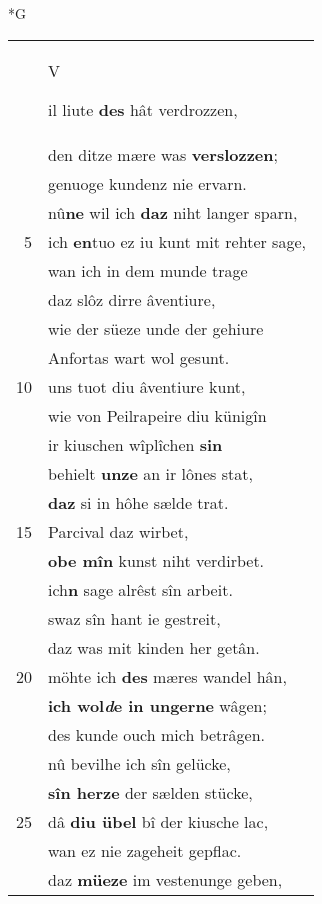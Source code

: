 \documentclass[8pt,a4paper,notitlepage]{article}
\begin{document}
\begin{table}[ht]
\begin{minipage}[t]{0.5\linewidth}
\small
\begin{center}*G
\end{center}
\begin{tabular}{rl}
 & \begin{Large}V\end{Large}il liute \textbf{des} hât verdrozzen,\\ 
 & den ditze mære was \textbf{verslozzen};\\ 
 & genuoge kundenz nie ervarn.\\ 
 & nû\textbf{ne} wil ich \textbf{daz} niht langer sparn,\\ 
5 & ich \textbf{en}tuo ez iu kunt mit rehter sage,\\ 
 & wan ich in dem munde trage\\ 
 & daz slôz dirre âventiure,\\ 
 & wie der süeze unde der gehiure\\ 
 & Anfortas wart wol gesunt.\\ 
10 & uns tuot diu âventiure kunt,\\ 
 & wie von Peilrapeire diu künigîn\\ 
 & ir kiuschen wîplîchen \textbf{sin}\\ 
 & behielt \textbf{unze} an ir lônes stat,\\ 
 & \textbf{daz} si in hôhe sælde trat.\\ 
15 & Parcival daz wirbet,\\ 
 & \textbf{obe mîn} kunst niht verdirbet.\\ 
 & ich\textbf{n} sage alrêst sîn arbeit.\\ 
 & swaz sîn hant ie gestreit,\\ 
 & daz was mit kinden her getân.\\ 
20 & möhte ich \textbf{des} mæres wandel hân,\\ 
 & \textbf{ich wol\textit{d}e in ungerne} wâgen;\\ 
 & des kunde ouch mich betrâgen.\\ 
 & nû bevilhe ich sîn gelücke,\\ 
 & \textbf{sîn herze} der sælden stücke,\\ 
25 & dâ \textbf{diu übel} bî der kiusche lac,\\ 
 & wan ez nie zageheit gepflac.\\ 
 & daz \textbf{müeze} im vestenunge geben,\\ 

\end{tabular}
\end{minipage}
\end{table}
\end{document}
